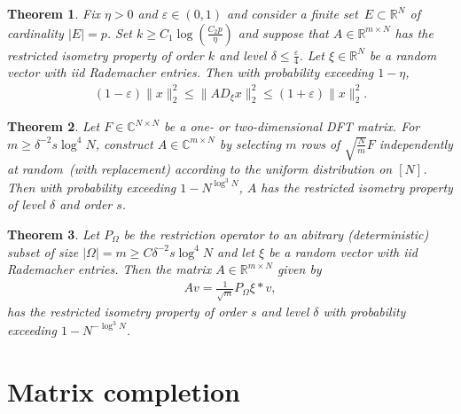 \documentclass[13pt]{article}
\newtheorem{thm}{Theorem}[section]
\theoremstyle{plain}
\newcommand{\R}{\mathbb{R}}
\newcommand{\C}{\mathbb{C}}
\begin{document}
\begin{thm}
    Fix $\eta > 0$ and $\varepsilon \in (0,1)$ and consider a finite set $E \subset \R^N$ of
    cardinality $|E| = p$. Set $k \ge C_1 \log\left( \frac{C_2p}{\eta} \right)$ and suppose
    that $A \in \R^{m \times N}$ has the restricted isometry property of order $k$ and level
    $\delta \le \frac{\varepsilon}{4}$. Let $\xi \in \R^N$ be a random vector with iid
    Rademacher entries. Then with probability exceeding $1 - \eta$,
    \[
        \begin{aligned}
            (1-\varepsilon)\|x\|_2^2 \le \|AD_{\xi} x\|_2^2 \le (1+\varepsilon)\|x\|_2^2.
        \end{aligned}
    \]
\end{thm} 

\begin{thm}
    Let $F \in \C^{N \times N}$ be a one- or two-dimensional DFT matrix.
    For $m \ge \delta^{-2} s \log^4 N$, construct $A \in \C^{m \times N}$ by selecting
    $m$ rows of $\sqrt{\frac{N}{m}} F$ independently at random (with replacement)
    according to the uniform distribution on $[N]$.
    Then with probability exceeding $1 - N^{\log^3 N}$, $A$ has the
    restricted isometry property of level $\delta$ and order $s$.
\end{thm}

\begin{thm}
    Let $P_\Omega$ be the restriction operator to an abitrary (deterministic) subset
    of size $|\Omega| = m \ge C \delta^{-2} s\log^4 N$ and let
    $\xi$ be a random vector with iid Rademacher entries. Then the matrix $A \in \R^{m \times N}$ 
    given by
    \[
        \begin{aligned}
            Av = \frac{1}{\sqrt{m}} P_{\Omega} \xi \ast v,
        \end{aligned}
    \]
    has the restricted isometry property of order $s$ and level $\delta$
    with probability exceeding $1 - N^{-\log^3 N}$.
\end{thm}

\newpage

\section{Matrix completion}

\newpage

\printbibliography[heading=bibintoc]
\end{document}
